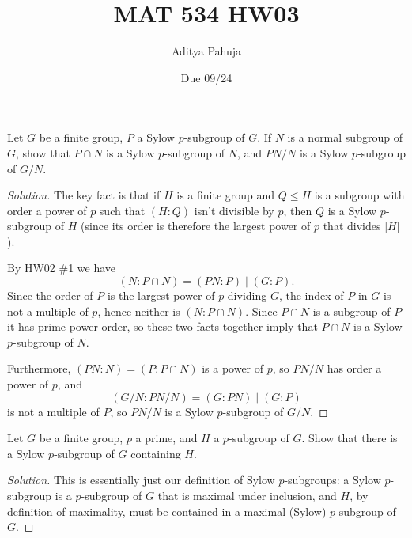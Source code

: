 \documentclass[10pt]{article}
\title{MAT 534 HW03}
\author{\large Aditya Pahuja}
\date{\large Due 09/24}
\newenvironment{soln}{\begin{proof}[Solution]}{\end{proof}}
\providecommand{\abs}[1]{\left|#1\right|}
\begin{document}
\maketitle

\begin{problem}
    Let $G$ be a finite group, $P$ a Sylow $p$-subgroup of $G$.
    If $N$ is a normal subgroup of $G$, show that $P\cap N$
    is a Sylow $p$-subgroup of $N$, and $PN/N$ is a Sylow $p$-subgroup of $G/N$.
\end{problem}

\begin{soln}
    The key fact is that if $H$ is a finite group and $Q\le H$
    is a subgroup with order a power of $p$ such that $(H:Q)$ isn't divisible by $p$,
    then $Q$ is a Sylow $p$-subgroup of $H$ (since its order is therefore
    the largest power of $p$ that divides $\abs H$).

    By HW02 \#1 we have
    \begin{equation*}
	(N : P\cap N) = (PN : P) \mid (G : P).
    \end{equation*}
    Since the order of $P$ is the largest power of $p$ dividing $G$,
    the index of $P$ in $G$ is not a multiple of $p$,
    hence neither is $(N : P\cap N)$. Since $P\cap N$ is a subgroup of $P$
    it has prime power order, so these two facts together imply that
    $P\cap N$ is a Sylow $p$-subgroup of $N$.

    Furthermore, $(PN : N) = (P : P\cap N)$ is a power of $p$,
    so $PN/N$ has order a power of $p$, and
    \begin{equation*}
	(G/N : PN/N) = (G : PN) \mid (G : P)
    \end{equation*}
    is not a multiple of $P$, so $PN/N$ is a Sylow $p$-subgroup of $G/N$.
\end{soln}

\begin{problem}
    Let $G$ be a finite group, $p$ a prime, and $H$ a $p$-subgroup of $G$.
    Show that there is a Sylow $p$-subgroup of $G$ containing $H$.
\end{problem}

\begin{soln}
    This is essentially just our definition of Sylow $p$-subgroups:
    a Sylow $p$-subgroup is a $p$-subgroup of $G$ that is maximal under inclusion,
    and $H$, by definition of maximality,
    must be contained in a maximal (Sylow) $p$-subgroup of $G$.
\end{soln}
\end{document}
